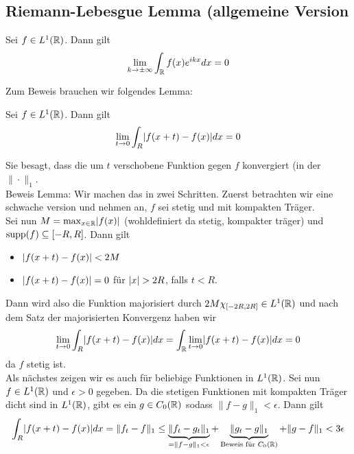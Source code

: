 \subsection{Riemann-Lebesgue Lemma (allgemeine Version}

\begin{satz}
	Sei $f \in L^1(\mathbb{R})$. Dann gilt
	\begin{align*}
					\lim_{k \to \pm \infty} \int_{\mathbb{R}} f(x) e^{ikx}dx = 0
	\end{align*}
\end{satz}
Zum Beweis brauchen wir folgendes Lemma:
\begin{lemma}[]
				Sei $f \in L^1(\mathbb{R})$. Dann gilt
\begin{align*}
				\lim_{t \to 0} \int_R \abs{f(x+t) - f(x)}dx = 0
\end{align*}
\end{lemma}
Sie besagt, dass die um $t$ verschobene Funktion gegen $f$ konvergiert (in der $\|\cdot\|_1$.\\
Beweis Lemma: \quad Wir machen das in zwei Schritten. Zuerst betrachten wir eine schwache version und nehmen an, $f$ sei stetig und mit kompakten Träger.\\
Sei nun $M = \max_{x \in \R} \abs{f(x)}$ (wohldefiniert da stetig, kompakter träger) und $\operatorname{supp}(f) \subseteq [-R,R]$. Dann gilt
\begin{itemize}
				\item $\vert f(x+t) - f(x)\vert < 2M$
				\item $\vert f(x+t) - f(x)\vert = 0$ für $\vert x\vert > 2R$, falls $t < R$.
\end{itemize}
Dann wird also die Funktion majorisiert durch $2M \chi_{[-2R,2R]} \in L^1(\mathbb{R})$ und nach dem Satz der majorisierten Konvergenz haben wir
\begin{align*}
				\lim_{t \to 0}\int_R \abs{f(x+t) - f(x)}dx = \int_{\R} \lim_{t \to 0} \abs{f(x + t) - f(x)}dx = 0
\end{align*}
da $f$ stetig ist.\\
Als nächstes zeigen wir es auch für beliebige Funktionen in $L^1(\mathbb{R})$. Sei nun $f \in L^1(\mathbb{R})$ und $ \epsilon > 0$ gegeben. Da die stetigen Funktionen mit kompakten Träger dicht sind in $L^1(\mathbb{R})$, gibt es ein $g \in C_0(\mathbb{R})$ sodass $\|f-g\|_1 < \epsilon$. Dann gilt
\begin{align*}
				\int_R \abs{f(x+t) - f(x)}dx = \|f_t - f\|_1 \leq \underbrace{\|f_t - g_t\|_1}_{= \|f - g\|_1 < \epsilon} + \underbrace{\|g_t - g\|_1}_{\text{Beweis für $C_0(\R)$}} + \|g - f\|_1 < 3 \epsilon 
\end{align*}

